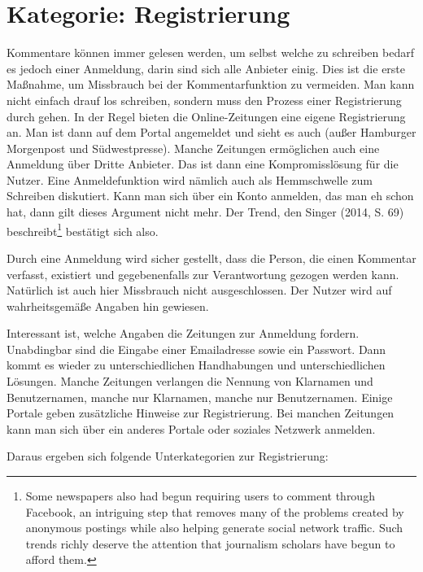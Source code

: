 

\section{Kategorie: \glqq Registrierung\grqq}

Kommentare können immer gelesen werden, um selbst welche zu schreiben bedarf es
jedoch einer Anmeldung, darin sind sich alle Anbieter einig. Dies ist die erste
Maßnahme, um Missbrauch bei der Kommentarfunktion zu vermeiden. Man kann nicht
einfach drauf los schreiben, sondern muss den Prozess einer Registrierung durch
gehen. In der Regel bieten die Online-Zeitungen eine eigene Registrierung an.
Man ist dann auf dem Portal angemeldet und sieht es auch (außer Hamburger
Morgenpost und Südwestpresse). Manche Zeitungen ermöglichen auch eine Anmeldung
über Dritte Anbieter. Das ist dann eine Kompromisslösung für die Nutzer. Eine
Anmeldefunktion wird nämlich auch als Hemmschwelle zum Schreiben diskutiert.
Kann man sich über ein Konto anmelden, das man eh schon hat, dann gilt dieses
Argument nicht mehr. Der Trend, den Singer (2014, S. 69)
beschreibt\footnote{\glqq Some newspapers also had begun requiring users to
comment through Facebook, an intriguing step that removes many of the problems
created by anonymous postings while also helping generate social network
traffic. Such trends richly deserve the attention that journalism scholars have
begun to afford them.\grqq} bestätigt sich also.

Durch eine Anmeldung wird sicher gestellt, dass die Person, die einen Kommentar
verfasst, existiert und gegebenenfalls zur Verantwortung gezogen werden kann.
Natürlich ist auch hier Missbrauch nicht ausgeschlossen. Der Nutzer wird auf
wahrheitsgemäße Angaben hin gewiesen. 

Interessant ist, welche Angaben die Zeitungen zur Anmeldung fordern. Unabdingbar
sind die Eingabe einer Emailadresse sowie ein Passwort. Dann kommt es wieder zu
unterschiedlichen Handhabungen und unterschiedlichen Lösungen. Manche Zeitungen
verlangen die Nennung von Klarnamen und Benutzernamen, manche nur Klarnamen,
manche nur Benutzernamen. Einige Portale geben zusätzliche Hinweise zur
Registrierung. Bei manchen Zeitungen kann man sich über ein anderes Portale oder 
soziales Netzwerk anmelden.

Daraus ergeben sich folgende Unterkategorien zur Registrierung:

